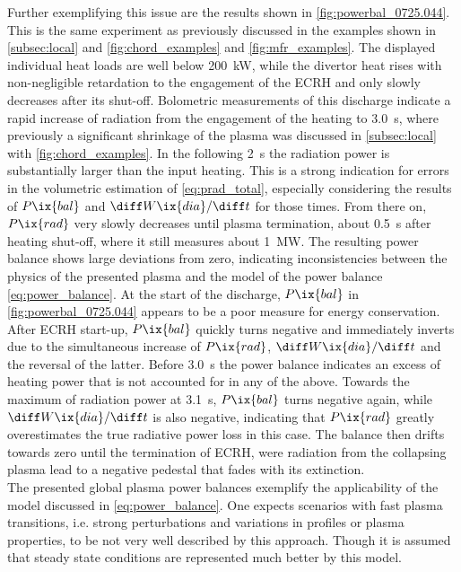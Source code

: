             Further exemplifying this issue are the results shown in \autoref{fig:powerbal_0725.044}. This is the same experiment as previously discussed in the examples shown in \cref{subsec:local} and \cref{fig:chord_examples} and \cref{fig:mfr_examples}. The displayed individual heat loads are well below \SI{200}{\kilo\watt}, while the divertor heat rises with non-negligible retardation to the engagement of the ECRH and only slowly decreases after its shut-off. Bolometric measurements of this discharge indicate a rapid increase of radiation from the engagement of the heating to \SI{3.0}{\second}, where previously a significant shrinkage of the plasma was discussed in \cref{subsec:local} with \cref{fig:chord_examples}. In the following \SI{2}{\second} the radiation power is substantially larger than the input heating. This is a strong indication for errors in the volumetric estimation of \cref{eq:prad_total}, especially considering the results of $P\ix{bal}$ and $\diff W\ix{dia}/\diff t$ for those times. From there on, $P\ix{rad}$ very slowly decreases until plasma termination, about \SI{0.5}{\second} after heating shut-off, where it still measures about \SI{1}{\mega\watt}. The resulting power balance shows large deviations from zero, indicating inconsistencies between the physics of the presented plasma and the model of the power balance \cref{eq:power_balance}. At the start of the discharge, $P\ix{bal}$ in \cref{fig:powerbal_0725.044} appears to be a poor measure for energy conservation. After ECRH start-up, $P\ix{bal}$ quickly turns negative and immediately inverts due to the simultaneous increase of $P\ix{rad}$, $\diff W\ix{dia}/\diff t$ and the reversal of the latter. Before \SI{3.0}{\second} the power balance indicates an excess of heating power that is not accounted for in any of the above. Towards the maximum of radiation power at \SI{3.1}{\second}, $P\ix{bal}$ turns negative again, while $\diff W\ix{dia}/\diff t$ is also negative, indicating that $P\ix{rad}$ greatly overestimates the true radiative power loss in this case. The balance then drifts towards zero until the termination of ECRH, were radiation from the collapsing plasma lead to a negative pedestal that fades with its extinction.\\%
            The presented global plasma power balances exemplify the applicability of the model discussed in \cref{eq:power_balance}. One expects scenarios with fast plasma transitions, i.e. strong perturbations and variations in profiles or plasma properties, to be not very well described by this approach. Though it is assumed that steady state conditions are represented much better by this model.\\%
            \,\newline%
%
